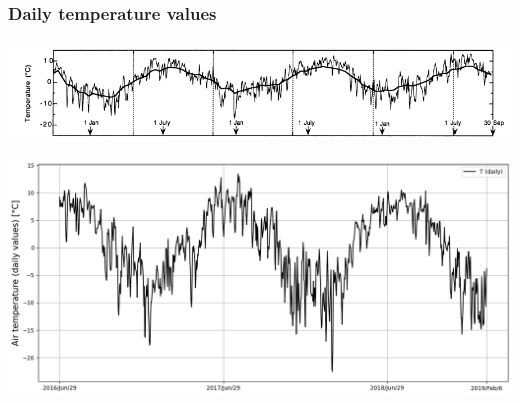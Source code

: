 \begin{frame}
    \frametitle{Daily temperature values}
    \framesubtitle{}

    \center
    \begin{minipage}{0.5\textwidth}
        \includegraphics[width=\textwidth]{Immagini/temperaturaOerlemans.png}
    \end{minipage}
    \begin{minipage}{0.5\textwidth}
        \includegraphics[width=\textwidth]{Immagini/tempAria.png}
    \end{minipage}

\end{frame}

